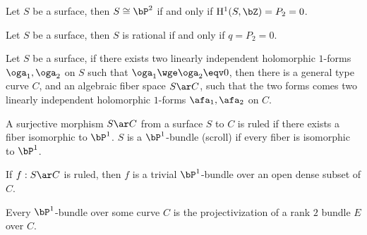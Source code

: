 \documentclass[article, a4paper, twoside]{universal}
\begin{document}

\begin{thm}
	Let $S$ be a surface, then $S\cong\bP^{2}$ if and only if  $\mathrm{H}_{}^{1}(S,\bZ)=P_{2}=0$.
\end{thm}

\begin{thm}
	Let $S$ be a surface, then $S$ is rational if and only if $q=P_{2}=0$.
\end{thm}

\begin{thm}
	Let $S$ be a surface, if there exists two linearly independent holomorphic $1$-forms $\oga_{1},\oga_{2}$ on $S$ such that $\oga_{1}\wge\oga_{2}\eqv0$, then there is a general type curve $C$, and an algebraic fiber space $S\ar C$, such that the two forms comes two linearly independent holomorphic $1$-forms $\afa_{1},\afa_{2}$ on $C$.
\end{thm}



\begin{dfn}
	A surjective morphism $S\ar C$ from a surface $S$ to $C$ is ruled if there exists a fiber isomorphic to $\bP^{1}$. $S$ is a $\bP^{1}$-bundle (scroll) if every fiber is isomorphic to $\bP^{1}$.
\end{dfn}

\begin{thm}
	If $f:S\ar C$ is ruled, then $f$ is a trivial $\bP^{1}$-bundle over an open dense subset of $C$.
\end{thm}

\begin{thm}[Theorem~4.6]
	Every $\bP^{1}$-bundle over some curve $C$ is the projectivization of a rank $2$ bundle $E$ over $C$.
\end{thm}
\end{document}
